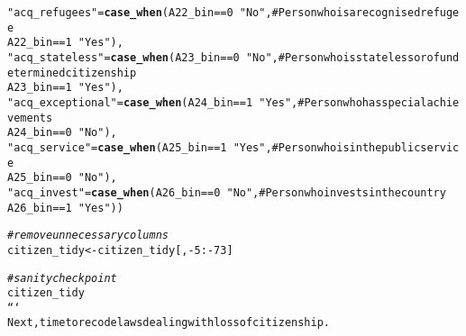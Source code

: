 \documentclass{article}\usepackage[]{graphicx}\usepackage[]{xcolor}
\makeatletter
\newcommand{\hlstr}[1]{\textcolor[rgb]{0.192,0.494,0.8}{#1}}%
\newcommand{\hlcom}[1]{\textcolor[rgb]{0.678,0.584,0.686}{\textit{#1}}}%
\newcommand{\hlkwd}[1]{\textcolor[rgb]{0.737,0.353,0.396}{\textbf{#1}}}%
\newenvironment{kframe}{%
 \def\at@end@of@kframe{}%
 \ifinner\ifhmode%
  \def\at@end@of@kframe{\end{minipage}}%
  \begin{minipage}{\columnwidth}%
 \fi\fi%
 \def\FrameCommand##1{\hskip\@totalleftmargin \hskip-\fboxsep
 \colorbox{shadecolor}{##1}\hskip-\fboxsep
     \hskip-\linewidth \hskip-\@totalleftmargin \hskip\columnwidth}%
 \MakeFramed {\advance\hsize-\width
   \@totalleftmargin\z@ \linewidth\hsize
   \@setminipage}}%
 {\par\unskip\endMakeFramed%
 \at@end@of@kframe}
\newenvironment{knitrout}{}{} %
\makeatother
\begin{document}
\begin{knitrout}
\begin{kframe}
\begin{alltt}
         \hlstr{"acq_refugees"} = \hlkwd{case_when}(A22_bin == 0 ~ \hlstr{"No"}, # Person who is a recognised refugee
                                    A22_bin == 1 ~ \hlstr{"Yes"}),
         \hlstr{"acq_stateless"} = \hlkwd{case_when}(A23_bin == 0 ~ \hlstr{"No"}, # Person who is stateless or of undetermined citizenship
                                     A23_bin == 1 ~ \hlstr{"Yes"}),
         \hlstr{"acq_exceptional"} = \hlkwd{case_when}(A24_bin == 1 ~ \hlstr{"Yes"}, # Person who has special achievements
                                       A24_bin == 0 ~ \hlstr{"No"}),
         \hlstr{"acq_service"} = \hlkwd{case_when}(A25_bin == 1 ~ \hlstr{"Yes"}, # Person who is in the public service
                                   A25_bin == 0 ~ \hlstr{"No"}),
         \hlstr{"acq_invest"} = \hlkwd{case_when}(A26_bin == 0 ~ \hlstr{"No"}, # Person who invests in the country
                                  A26_bin == 1 ~ \hlstr{"Yes"}))

\hlcom{# remove unnecessary columns }
citizen_tidy <- citizen_tidy[,-5:-73]

\hlcom{# sanity check point}
citizen_tidy
```
Next, time to recode laws dealing with loss of citizenship. 


\end{alltt}
\end{kframe}
\end{knitrout}
\end{document}
